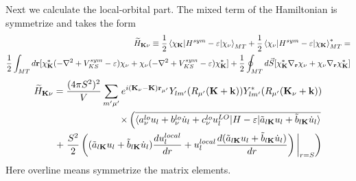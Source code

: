 \documentclass[aps,prb,floatfix,epsfig,singlecolumn,showpacs,preprintnumbers]{revtex4}
\renewcommand{\vr}{{\mathbf{r}}}
\newcommand{\vk}{{\mathbf{k}}}
\newcommand{\vK}{{\mathbf{K}}}
\begin{document}
Next we calculate the local-orbital part. 
%
The mixed term of the Hamiltonian is symmetrize and takes the form
\begin{eqnarray}
\widetilde{H}_{\vK\nu}\equiv \frac{1}{2}\braket{\chi_{\vK}|H^{sym}-\varepsilon|\chi_\nu}_{MT}
+\frac{1}{2}\braket{\chi_{\nu}|H^{sym}-\varepsilon|\chi_\vK}^*_{MT}
=\\
\frac{1}{2}\int_{MT}d\vr[ \chi^*_{\vK}(-\nabla^2+V_{KS}^{sym}-\varepsilon)\chi_{\nu}+\chi_{\nu}(-\nabla^2+V_{KS}^{sym}-\varepsilon)\chi^*_{\vK}]+
\frac{1}{2}\oint_{MT} d\vec{S}[\chi^*_{\vK}\nabla_\vr\chi_{\nu}+\chi_{\nu}\nabla_\vr\chi^*_{\vK}]
\end{eqnarray}
\begin{eqnarray}
\widetilde{H}_{\vK\nu}=
\frac{(4\pi  S^2)^2}{V}\sum_{m'\mu'} e^{i(\vK_\nu-\vK)\vr_{\mu'}}
Y_{lm'}(R_{\mu'}(\vK+\vk)) Y^*_{lm'}(R_{\mu'}(\vK_\nu+\vk))  
\\
\times
\left(\overline{\braket{a^{lo}_{\nu}u_l+b^{lo}_{\nu}\dot{u}_l+c^{lo}_{\nu}u^{LO}_l|H-\varepsilon|\tilde{a}_{l\vK}  u_l+\tilde{b}_{l\vK} \dot{u}_l}}
\right.
\\
+\left.
\frac{S^2}{2}
\left(
(\tilde{a}_{l\vK}  u_l+\tilde{b}_{l\vK} \dot{u}_l)
\frac{d u^{local}_l}{dr}
+
u^{local}_l\frac{d (\tilde{a}_{l\vK}  u_l+\tilde{b}_{l\vK} \dot{u}_l)}{dr}
\right)\biggl|_{r=S}
\right)
\label{Eq:wdrop}
\end{eqnarray}
Here overline means symmetrize the matrix elements. 
\end{document}
